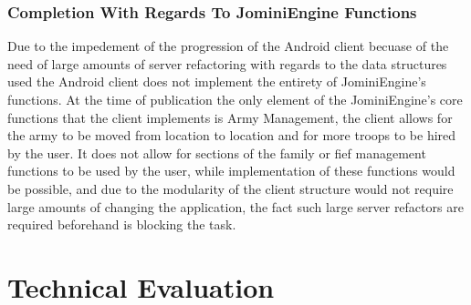 \documentclass{article}
\begin{document}
\subsubsection{Completion With Regards To JominiEngine Functions}
Due to the impedement of the progression of the Android client becuase of the need of large amounts of server refactoring with regards to the data structures used the Android client does not implement the entirety of JominiEngine's functions. At the time of publication the only element of the JominiEngine's core functions that the client implements is Army Management, the client allows for the army to be moved from location to location and for more troops to be hired by the user. It does not allow for sections of the family or fief management functions to be used by the user, while implementation of these functions would be possible, and due to the modularity of the client structure would not require large amounts of changing the application, the fact such large server refactors are required beforehand is blocking the task.
\section{Technical Evaluation}
\end{document}

